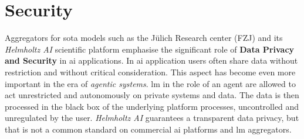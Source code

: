 \section{Security}
Aggregators for \ac{sota} models such as the Jülich Research center (FZJ) and its \textit{Helmholtz AI} scientific platform emphasise the significant role of \textbf{Data Privacy and Security} in \ac{ai} applications.
In \ac{ai} application users often share data without restriction and without critical consideration.
This aspect has become even more important in the era of \textit{agentic systems}.
\ac{lm} in the role of an agent are allowed to act unrestricted and autonomously on private systems and data.
The data is then processed in the black box of the underlying platform processes, uncontrolled and unregulated by the user.
\textit{Helmholtz AI} guarantees a transparent data privacy, but that is not a common standard on commercial \ac{ai} platforms and \ac{lm} aggregators.